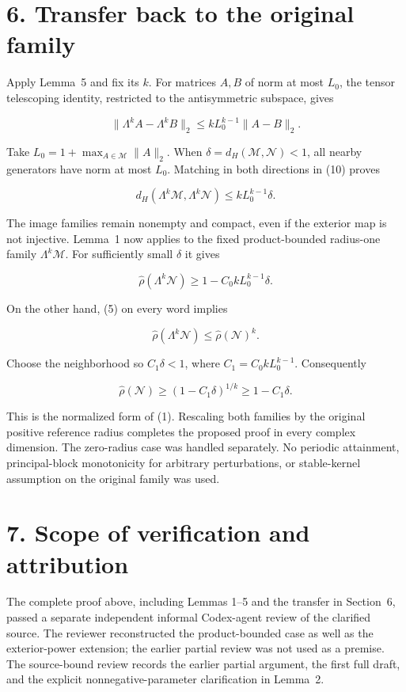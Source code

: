 \documentclass[11pt,a4paper]{article}
\begin{document}
\section{6. Transfer back to the original family}\label{transfer-back-to-the-original-family}

Apply Lemma~5 and fix its \(k\). For matrices \(A,B\) of norm at most \(L_0\), the tensor telescoping identity, restricted to the antisymmetric subspace, gives

\[
\|\Lambda^k A-\Lambda^k B\|_2
\le kL_0^{k-1}\|A-B\|_2.
\tag{10}
\]

Take \(L_0=1+\max_{A\in\mathcal M}\|A\|_2\). When \(\delta=d_H(\mathcal M,\mathcal N)<1\), all nearby generators have norm at most \(L_0\). Matching in both directions in (10) proves

\[
d_H(\Lambda^k\mathcal M,\Lambda^k\mathcal N)
\le kL_0^{k-1}\delta.
\tag{11}
\]

The image families remain nonempty and compact, even if the exterior map is not injective. Lemma~1 now applies to the fixed product-bounded radius-one family \(\Lambda^k\mathcal M\). For sufficiently small \(\delta\) it gives

\[
\widehat\rho(\Lambda^k\mathcal N)\ge1-C_0kL_0^{k-1}\delta.
\]

On the other hand, (5) on every word implies

\[
\widehat\rho(\Lambda^k\mathcal N)\le\widehat\rho(\mathcal N)^k.
\]

Choose the neighborhood so \(C_1\delta<1\), where \(C_1=C_0kL_0^{k-1}\). Consequently

\[
\widehat\rho(\mathcal N)
\ge(1-C_1\delta)^{1/k}\ge1-C_1\delta.
\]

This is the normalized form of (1). Rescaling both families by the original positive reference radius completes the proposed proof in every complex dimension. The zero-radius case was handled separately. No periodic attainment, principal-block monotonicity for arbitrary perturbations, or stable-kernel assumption on the original family was used.

\section{7. Scope of verification and attribution}\label{scope-of-verification-and-attribution}

The complete proof above, including Lemmas 1--5 and the transfer in Section~6, passed a separate independent informal Codex-agent review of the clarified source. The reviewer reconstructed the product-bounded case as well as the exterior-power extension; the earlier partial review was not used as a premise. The source-bound review records the earlier partial argument, the first full draft, and the explicit nonnegative-parameter clarification in Lemma~2.
\end{document}
